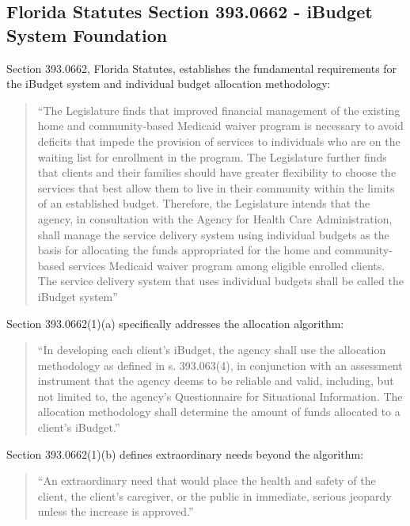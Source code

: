 \subsection{Florida Statutes Section 393.0662 - iBudget System Foundation}

Section 393.0662, Florida Statutes, establishes the fundamental requirements for the iBudget system and individual budget allocation methodology:

\begin{quote}
``The Legislature finds that improved financial management of the existing home and community-based Medicaid waiver program is necessary to avoid deficits that impede the provision of services to individuals who are on the waiting list for enrollment in the program. The Legislature further finds that clients and their families should have greater flexibility to choose the services that best allow them to live in their community within the limits of an established budget. Therefore, the Legislature intends that the agency, in consultation with the Agency for Health Care Administration, shall manage the service delivery system using individual budgets as the basis for allocating the funds appropriated for the home and community-based services Medicaid waiver program among eligible enrolled clients. The service delivery system that uses individual budgets shall be called the iBudget system''
\end{quote}

Section 393.0662(1)(a) specifically addresses the allocation algorithm:

\begin{quote}
``In developing each client's iBudget, the agency shall use the allocation methodology as defined in s. 393.063(4), in conjunction with an assessment instrument that the agency deems to be reliable and valid, including, but not limited to, the agency's Questionnaire for Situational Information. The allocation methodology shall determine the amount of funds allocated to a client's iBudget.''
\end{quote}

Section 393.0662(1)(b) defines extraordinary needs beyond the algorithm:

\begin{quote}
``An extraordinary need that would place the health and safety of the client, the client's caregiver, or the public in immediate, serious jeopardy unless the increase is approved.''
\end{quote}

